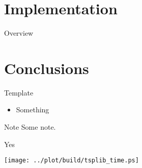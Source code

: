 \documentclass[
  size=10pt,
  style=klope,
  paper=screen,
  pauseslide,
  nopagebreaks,
  fleqn
]{powerdot}
\begin{document}
\section[template=wideslide]{Implementation}

\begin{slide}[toc=,bm=]{Overview}
\tableofcontents[content=currentsection,type=1]
\end{slide}

\section[template=wideslide]{Conclusions}

\begin{slide}[toc=]{Template}
  \begin{itemize}
  \item
  Something
  \begin{equation}
  \end{equation}
  \end{itemize}
\end{slide}

\begin{note}{Note}
  Some note.
\end{note}

\begin{wideslide}[toc=]{Yes}
  \begin{center}
    \texttt{[image: ../plot/build/tsplib\_time.ps]}
  \end{center}
\end{wideslide}
\end{document}
